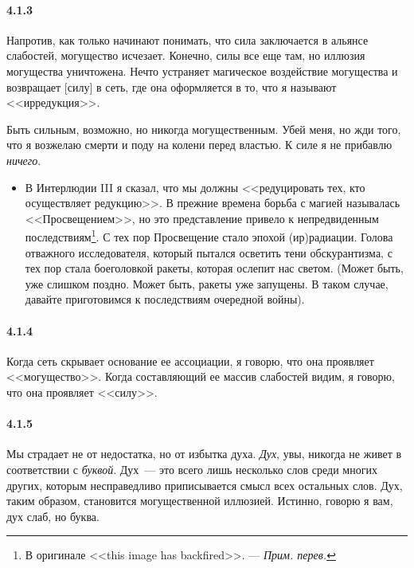 \paragraph{4.1.3}\hypertarget{par:4.1.3}{} Напротив, как только начинают понимать, что сила заключается в альянсе слабостей, могущество исчезает. Конечно, силы все еще там, но иллюзия могущества уничтожена. Нечто устраняет магическое воздействие могущества и возвращает [силу] в сеть, где она оформляется в то, что я называют <<ирредукция>>. 

Быть сильным, возможно, но никогда могущественным. Убей меня, но жди того, что я возжелаю смерти и поду на колени перед властью. К силе я не прибавлю {\itshape ничего}.

	\begin{itemize}
	\item 
	В Интерлюдии III я сказал, что мы должны <<редуцировать тех, кто осуществляет редукцию>>. В прежние времена борьба с магией называлась <<Просвещением>>, но это представление привело к непредвиденным последствиям\footnote{В оригинале <<this image has backfired>>. --- {\itshape Прим. перев.}}. С тех пор Просвещение стало эпохой (ир)радиации. Голова отважного исследователя, который пытался осветить тени обскурантизма, с тех пор стала боеголовкой ракеты, которая ослепит нас светом. (Может быть, уже слишком поздно. Может быть, ракеты уже запущены. В таком случае, давайте приготовимся к последствиям очередной войны).
	\end{itemize}	


\paragraph{4.1.4}\hypertarget{par:4.1.4}{} Когда сеть скрывает основание ее ассоциации, я говорю, что она проявляет <<могущество>>. Когда составляющий ее массив слабостей видим, я говорю, что она проявляет <<силу>>.


\paragraph{4.1.5}\hypertarget{par:4.1.5}{} Мы страдает не от недостатка, но от избытка духа. {\itshape Дух}, увы, никогда не живет в соответствии с {\itshape буквой}. Дух~--- это всего лишь несколько слов среди многих других, которым несправедливо приписывается смысл всех остальных слов. Дух, таким образом, становится могущественной иллюзией. Истинно, говорю я вам, дух слаб, но буква.

